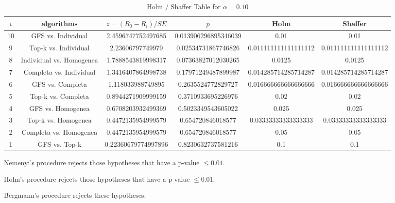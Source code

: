 \documentclass[a4paper,10pt]{article}
\begin{document}
\begin{landscape}
\begin{table}[!htp]
\centering\tiny
\caption{Holm / Shaffer Table for $\alpha=0.10$}
\begin{tabular}{cccccc}
$i$&algorithms&$z=(R_0 - R_i)/SE$&$p$&Holm&Shaffer\\
\hline
10&GFS vs. Individual&2.4596747752497685&0.013906296895346039&0.01&0.01\\
9&Top-k vs. Individual&2.23606797749979&0.02534731867746826&0.011111111111111112&0.011111111111111112\\
8&Individual vs. Homogenea&1.7888543819998317&0.07363827012030265&0.0125&0.0125\\
7&Completa vs. Individual&1.3416407864998738&0.17971249487899987&0.014285714285714287&0.014285714285714287\\
6&GFS vs. Completa&1.118033988749895&0.2635524772829727&0.016666666666666666&0.016666666666666666\\
5&Top-k vs. Completa&0.8944271909999159&0.3710933695226976&0.02&0.02\\
4&GFS vs. Homogenea&0.6708203932499369&0.5023349543605022&0.025&0.025\\
3&Top-k vs. Homogenea&0.4472135954999579&0.654720846018577&0.03333333333333333&0.03333333333333333\\
2&Completa vs. Homogenea&0.4472135954999579&0.654720846018577&0.05&0.05\\
1&GFS vs. Top-k&0.22360679774997896&0.8230632737581216&0.1&0.1\\
\hline
\end{tabular}
\end{table}
Nemenyi's procedure rejects those hypotheses that have a p-value $\le0.01$.


Holm's procedure rejects those hypotheses that have a p-value $\le0.01$.


Bergmann's procedure rejects these hypotheses:


\begin{itemize}


\end{itemize}



\end{landscape}
\end{document}
